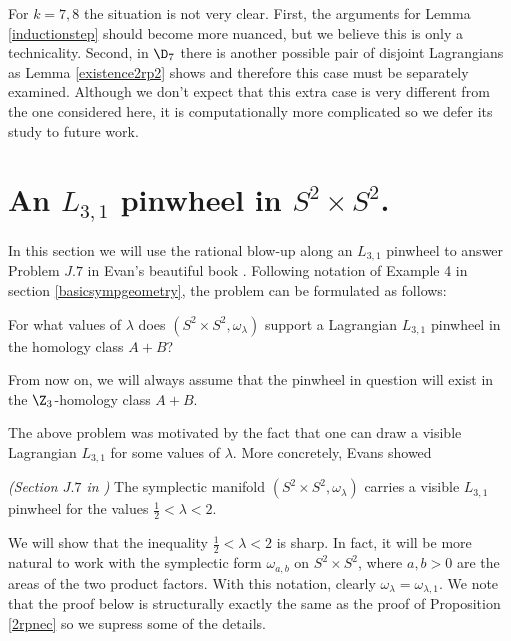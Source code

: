For $k=7,8$ the situation is not very clear. First, the arguments for Lemma \ref{inductionstep} should become more nuanced, but we believe this is only a technicality. Second, in $\D_7$ there is another possible pair of disjoint Lagrangians as Lemma \ref{existence2rp2} shows and therefore this case must be separately examined. Although we don't expect that this extra case is very different from the one considered here, it is computationally more complicated so we defer its study to future work.





\section{An $L_{3,1}$ pinwheel in $S^2\times S^2$.}

In this section we will use the rational blow-up along an $L_{3,1}$ pinwheel to answer Problem $J.7$ in Evan's beautiful book \cite{evans_2023}. Following notation of Example 4 in section \ref{basicsympgeometry}, the problem can be formulated as follows:

\begin{prob}
For what values of $\lambda$ does $(S^2\times S^2,\omega_\lambda)$ support a Lagrangian $L_{3,1}$ pinwheel in the homology class $A+B$?
\end{prob}

From now on, we will always assume that the pinwheel in question will exist in the $\Z_3$-homology class $A+B$.\par 
The above problem was motivated by the fact that one can draw a visible Lagrangian $L_{3,1}$ for some values of $\lambda$.  More concretely, Evans showed

\begin{lemma}\emph{(Section $J.7$ in \cite{evans_2023})}\label{l31suf}
The symplectic manifold $(S^2\times S^2,\omega_\lambda)$ carries a visible $L_{3,1}$ pinwheel for the values $\frac{1}{2}<\lambda< 2$. 
\end{lemma}

We will show that the inequality $\frac{1}{2}<\lambda<2$ is sharp. In fact, it will be more natural to work with the symplectic form $\omega_{a,b}$ on $S^2\times S^2$, where $a,b>0$ are the areas of the two product factors. With this notation, clearly $\omega_\lambda=\omega_{\lambda,1}$. We note that the proof below is structurally exactly the same as the proof of Proposition \ref{2rpnec} so we supress some of the details.

